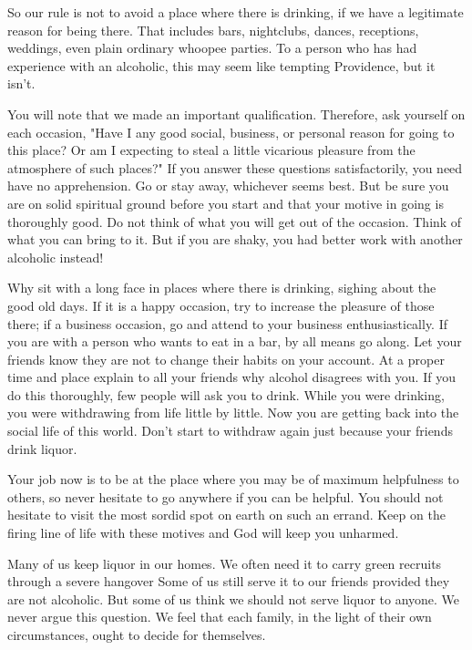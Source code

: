 \begin{biblechapter}
So our rule is not to avoid a place where there is drinking, if we have a legitimate reason for being there.  That includes bars, nightclubs, dances, receptions, weddings, even plain ordinary whoopee parties.  To a person who has had experience with an alcoholic, this may seem like tempting Providence, but it isn't.

You will note that we made an important qualification.  Therefore, ask yourself on each occasion, "Have I any good social, business, or personal reason for going to this place?  Or am I expecting to steal a little vicarious pleasure from the atmosphere of such places?"  If you answer these questions satisfactorily, you need have no apprehension.  Go or stay away, whichever seems best.  But be sure you are on solid spiritual ground before you start and that your motive in going is thoroughly good.  Do not think of what you will get out of the occasion.  Think of what you can bring to it.  But if you are shaky, you had better work with another alcoholic instead!

Why sit with a long face in places where there is drinking, sighing about the good old days.  If it is a happy occasion, try to increase the pleasure of those there; if a business occasion, go and attend to your business enthusiastically.  If you are with a person who wants to eat in a bar, by all means go along.  Let your friends know they are not to change their habits on your account.  At a proper time and place explain to all your friends why alcohol disagrees with you.  If you do this thoroughly, few people will ask you to drink.  While you were drinking, you were withdrawing from life little by little.  Now you are getting back into the social life of this world.  Don't start to withdraw again just because your friends drink liquor.

Your job now is to be at the place where you may be of maximum helpfulness to others, so never hesitate to go anywhere if you can be helpful.  You should not hesitate to visit the most sordid spot on earth on such an errand.  Keep on the firing line of life with these motives and God will keep you unharmed.

Many of us keep liquor in our homes.  We often need it to carry green recruits through a severe hangover  Some of us still serve it to our friends provided they are not alcoholic.  But some of us think we should not serve liquor to anyone.  We never argue this question.  We feel that each family, in the light of their own circumstances, ought to decide for themselves.


\end{biblechapter}
